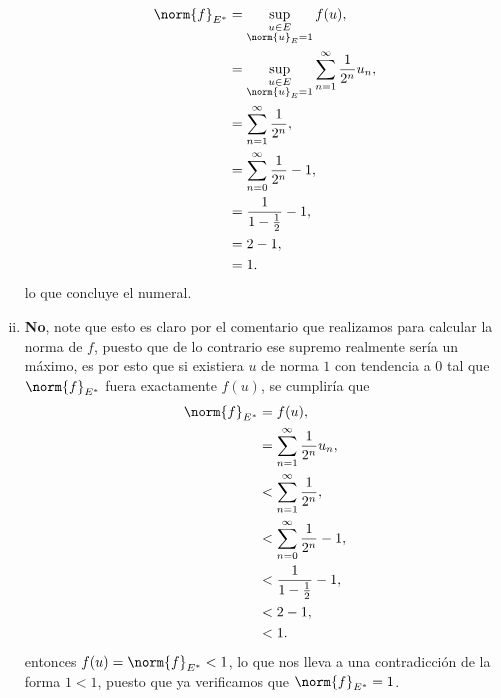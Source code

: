 \begin{homeworkProblem}
\begin{solution}
\begin{enumerate}[(i)]
        \begin{align*}
          \norm{f}_{E^{*}}&=\sup_{\substack{u\in E\\ \norm{u}_{E}=1}}f(u),\\
          &=\sup_{\substack{u\in E\\\norm{u}_{E}=1}}\sum_{n=1}^{\infty}\frac{1}{2^n}u_n,\\
          &=\sum_{n=1}^{\infty}\frac{1}{2^n},\\
          &=\sum_{n=0}^{\infty}\frac{1}{2^{n}} - 1,\\
          &=\frac{1}{1-\frac{1}{2}}-1,\\
          &=2-1,\\
          &=1.
        \end{align*}
        lo que concluye el numeral.
      \item \textbf{No}, note que esto es claro por el comentario que realizamos para calcular la norma de $f$, puesto que de lo contrario ese supremo realmente sería un máximo, es por esto que si existiera $u$ de norma $1$ con tendencia a $0$ tal que $\norm{f}_{E^*}$ fuera exactamente $f(u)$, se cumpliría que
        \begin{align*}
          \norm{f}_{E^{*}}&=f(u),\\
          &=\sum_{n=1}^{\infty}\frac{1}{2^n}u_n,\\
          &<\sum_{n=1}^{\infty}\frac{1}{2^n},\\
          &<\sum_{n=0}^{\infty}\frac{1}{2^{n}} - 1,\\
          &<\frac{1}{1-\frac{1}{2}}-1,\\
          &<2-1,\\
          &<1.
        \end{align*}
      entonces $f(u)=\norm{f}_{E^{*}}<1$, lo que nos lleva a una contradicción de la forma $1<1$, puesto que ya verificamos que $\norm{f}_{E^{*}}=1$.   
    \end{enumerate}
  \end{solution}
\end{homeworkProblem}
